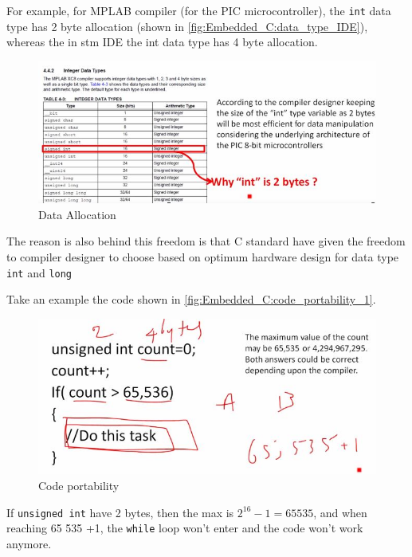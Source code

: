 For example, for MPLAB compiler (for the PIC microcontroller), the \verb|int| data type has 2 byte allocation (shown in \autoref{fig:Embedded_C:data_type_IDE}), whereas the in stm IDE the int data type has 4 byte allocation.


\begin{figure}[h]
\centering
\includegraphics[scale=0.5]{Figures/Embedded_C/data_type_IDE}
\caption{Data Allocation}
\label{fig:Embedded_C:data_type_IDE}
\end{figure} 

The reason is also behind this freedom is that C standard have given the freedom to compiler designer to choose based on optimum hardware design for data type \verb|int| and \verb|long|

Take an example the code shown in \autoref{fig:Embedded_C:code_portability_1}.

\begin{figure}[h]
\centering
\includegraphics[scale=0.5]{Figures/Embedded_C/code_portability_1}
\caption{Code portability}
\label{fig:Embedded_C:code_portability_1}
\end{figure} 

If \verb|unsigned int| have 2 bytes, then the max is $2^{16} -1 = 65 535$, and when reaching 65 535 +1, the \verb|while| loop won't enter and the code won't work anymore.\\

